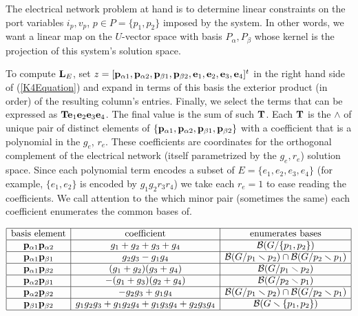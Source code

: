 The electrical network problem at hand is to determine linear constraints on the
port variables $i_p, v_p$, $p\in P = \{p_1, p_2\}$ imposed by the system.  In other words,
we want a linear map on the $U$-vector space with basis $P_\alpha, P_\beta$ whose kernel
is the projection of this system's solution space.

To compute $\mathbf{L}_E$, set 
$z=[\mathbf{p}_{\alpha 1},\mathbf{p}_{\alpha 2},\mathbf{p}_{\beta 1},\mathbf{p}_{\beta 2},
  \mathbf{e}_1,  \mathbf{e}_2,  \mathbf{e}_3,  \mathbf{e}_4]^t$
in the right hand side of (\ref{K4Equation}) 
and expand in terms of this basis
the exterior product (in order) of the resulting column's entries.
Finally, we select
the terms that can be expressed as $\mathbf{T}\mathbf{e}_1\mathbf{e}_2\mathbf{e}_3\mathbf{e}_4$.  The final
value is the sum of such $\mathbf{T}$.
Each $\mathbf{T}$ is the $\wedge$ of unique pair of distinct elements
of $\{\mathbf{p}_{\alpha 1}, \mathbf{p}_{\alpha 2}, \mathbf{p}_{\beta 1}, \mathbf{p}_{\beta 2}\}$
with a coefficient that is a polynomial in the 
$g_e$, $r_e$.  These coefficients are \Plucker coordinates
for the orthogonal complement of the electrical network
(itself parametrized by the $g_e, r_e$) solution space.
Since each polynomial
term encodes a subset of $E=\{e_1, e_2, e_3, e_4\}$ (for example, $\{e_1, e_2\}$ is encoded
by $g_1g_2r_3r_4$) we take each $r_e=1$ to ease reading the coefficients. We call attention
to the which minor pair (sometimes the same) each coefficient enumerates
the common bases of.


\begin{equation}\label{K4table}
\begin{array}{|c|c|c|} \hline
\text{basis element} & \text{coefficient} & \text{enumerates bases}\\
  \hline

\mathbf{p}_{\alpha 1}\mathbf{p}_{\alpha 2} &
g_1 + g_2 + g_3 + g_4 & \mathcal{B}(G/\{p_1, p_2\})

\\ \hline

\mathbf{p}_{\alpha 1}\mathbf{p}_{\beta 1} &
g_2g_3 - g_1g_4 &  \mathcal{B}(G/p_1\smallsetminus p_2)\cap\mathcal{B}(G/p_2\smallsetminus p_1)

\\ \hline

\mathbf{p}_{\alpha 1}\mathbf{p}_{\beta 2} &
(g_1 + g_2)(g_3 + g_4) & \mathcal{B}(G/p_1\smallsetminus p_2)
\\ \hline 

\mathbf{p}_{\alpha 2}\mathbf{p}_{\beta 1} & -(g_1 + g_3)(g_2+g_4) & \mathcal{B}(G/p_2\smallsetminus p_1)
\\ \hline
 
\mathbf{p}_{\alpha 2}\mathbf{p}_{\beta 2} &
-g_2g_3 + g_1g_4 & \mathcal{B}(G/p_1\smallsetminus p_2)\cap\mathcal{B}(G/p_2\smallsetminus p_1)
\\ \hline
 
\mathbf{p}_{\beta 1}\mathbf{p}_{\beta 2} &
g_1g_2g_3 + g_1g_2g_4 + g_1g_3g_4 + g_2g_3g_4 & \mathcal{B}(G\smallsetminus \{p_1, p_2\})
\\ \hline

\end{array}
\end{equation}
